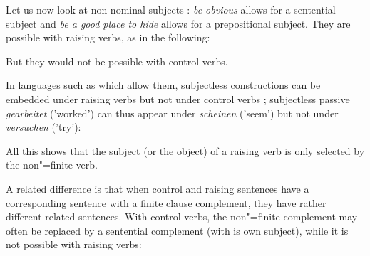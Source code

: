 \documentclass[output=paper
	        ,collection
	        ,collectionchapter
 	        ,biblatex
                ,babelshorthands
                ,newtxmath
                ,draftmode
                ,colorlinks, citecolor=brown
]{langscibook}
\begin{document}
\eal
\judgewidth{\#}
 \label{cat1}
 \label{cat2}
 \label{cat3}
 \label{cat4}
\zl

Let us now look at non-nominal subjects : \emph{be obvious} allows for a sentential subject and \emph{be a good place to hide} allows for a prepositional subject. They are possible with raising verbs, as in the following:
 
\eal 
{}
 \label{under}
\zl

But they would not be possible with control verbs.
\eal
{}
\zl

In languages such as  which allow them, subjectless constructions can be embedded under
raising verbs but not under control verbs \citep[]{Mueller2002b}; subjectless passive \emph{gearbeitet} ('worked') can thus appear under \emph{scheinen} ('seem') but not under \emph{versuchen} ('try'):

\eal
\label{german1}
\zl
 
 All this shows that the subject (or the object) of a raising verb is only selected by the non"=finite verb. 

A related difference is that when control and raising sentences have a corresponding sentence with a finite clause complement, they have rather different related sentences.
With control verbs, the non"=finite complement may often be replaced by a sentential complement (with is own subject), while it is not possible with raising verbs:
\end{document}
